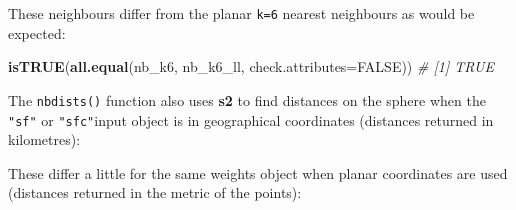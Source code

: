 \documentclass[]{book}
\newenvironment{Shaded}{\begin{snugshade}}{\end{snugshade}}
\newcommand{\CommentTok}[1]{\textcolor[rgb]{0.56,0.35,0.01}{\textit{#1}}}
\newcommand{\DataTypeTok}[1]{\textcolor[rgb]{0.13,0.29,0.53}{#1}}
\newcommand{\DecValTok}[1]{\textcolor[rgb]{0.00,0.00,0.81}{#1}}
\newcommand{\KeywordTok}[1]{\textcolor[rgb]{0.13,0.29,0.53}{\textbf{#1}}}
\newcommand{\NormalTok}[1]{#1}
\newcommand{\OperatorTok}[1]{\textcolor[rgb]{0.81,0.36,0.00}{\textbf{#1}}}
\newcommand{\OtherTok}[1]{\textcolor[rgb]{0.56,0.35,0.01}{#1}}
\newcommand{\StringTok}[1]{\textcolor[rgb]{0.31,0.60,0.02}{#1}}
\begin{document}
\begin{Shaded}
\end{Shaded}

These neighbours differ from the planar \texttt{k=6} nearest neighbours as would be expected:

\begin{Shaded}
\begin{Highlighting}[]
\KeywordTok{isTRUE}\NormalTok{(}\KeywordTok{all.equal}\NormalTok{(nb_k6, nb_k6_ll, }\DataTypeTok{check.attributes=}\OtherTok{FALSE}\NormalTok{))}
\CommentTok{# [1] TRUE}
\end{Highlighting}
\end{Shaded}

The \texttt{nbdists()} function also uses \textbf{s2} to find distances on the sphere when the \texttt{"sf"} or \texttt{"sfc"}input object is in geographical coordinates (distances returned in kilometres):

\begin{Shaded}
\end{Shaded}

These differ a little for the same weights object when planar coordinates are used (distances returned in the metric of the points):

\begin{Shaded}
\end{Shaded}
\end{document}
